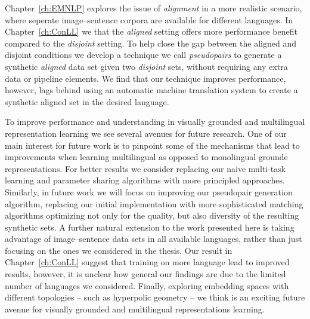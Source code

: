 Chapter~\ref{ch:EMNLP} explores the issue of \emph{alignment} in a more realistic scenario, where
seperate image--sentence corpora are available for different languages. 
In Chapter~\ref{ch:ConLL} we that the \emph{aligned}
setting offers more performance benefit compared to the \emph{disjoint} setting. 
To help close the gap between the aligned and disjoint conditions we develop a technique we call \emph{pseudopairs} 
to generate a synthetic \emph{aligned} data set given two \emph{disjoint} sets, without requiring any extra
data or pipeline elements. We find that our technique improves performance, however, lags behind using
an automatic machine translation system to create a synthetic aligned set in the desired language.

To improve performance and understanding in visually grounded and multilingual 
representation learning we see several avenues for future research. 
One of our main interest for future work is to pinpoint some of the mechanisms that lead to 
improvements when learning multilingual as opposed to monolingual grounde representations. 
For better results we consider replacing our naive multi-task learning and parameter sharing algorithms with 
more principled approaches. Similarly, in future work we will focus on improving our pseudopair generation 
algorithm, replacing our initial implementation with more sophisticated matching algorithms optimizing not
only for the quality, but also diversity of the resulting synthetic sets.
A further natural extension to the work presented here is taking advantage 
of image--sentence data sets in all available languages, rather than just focusing on the ones we considered 
in the thesis. Our result in Chapter~\ref{ch:ConLL} suggest that training on more language lead to improved results,
however, it is unclear how general our findings are due to the limited number of languages we considered.
Finally, exploring embedding spaces with different topologies -- such as hyperpolic geometry -- we think is an exciting
future avenue for visually grounded and multilingual representations learning.







